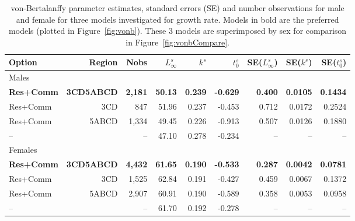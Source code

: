\begin{table}[b]
\centering
\caption{\label{tab:vonbEst} von-Bertalanffy parameter estimates, standard errors (SE) and number observations for male and female \fishname for three models investigated for growth rate. Models in bold are the preferred models (plotted in Figure~\ref{fig:vonb}). These 3 models are superimposed by sex for comparison in Figure~\ref{fig:vonbCompare}.}
\begin{tabular}{lrrrrrrrr}
\hline
Option & Region & Nobs & $L_{\infty}^s$ & $k^s$ & $t_0^s$ & SE($L_{\infty}^s$) & SE($k^s$) & SE($t_0^s$) \\
\hline
Males \\
\textbf{Res+Comm} & \textbf{3CD5ABCD} & \textbf{2,181} & \textbf{50.13} & \textbf{0.239} & \textbf{-0.629} & \textbf{0.400} & \textbf{0.0105} & \textbf{0.1434} \\
Res+Comm & 3CD              & 847   & 51.96 & 0.237 & -0.453 & 0.712 & 0.0172 & 0.2524 \\
Res+Comm & 5ABCD            & 1,334 & 49.45 & 0.226 & -0.913 & 0.507 & 0.0126 & 0.1880 \\
 --      & \citet{arf2001}  & --    & 47.10 & 0.278 & -0.234 &    -- & --     & -- \\
Females \\
\textbf{Res+Comm} & \textbf{3CD5ABCD} & \textbf{4,432} & \textbf{61.65} & \textbf{0.190} & \textbf{-0.533} & \textbf{0.287} & \textbf{0.0042} & \textbf{0.0781} \\
Res+Comm & 3CD              & 1,525 & 62.84 & 0.191 & -0.427 & 0.459 & 0.0067 & 0.1372 \\
Res+Comm & 5ABCD            & 2,907 & 60.91 & 0.190 & -0.589 & 0.358 & 0.0053 & 0.0958 \\
 --      & \citet{arf2001}  & --    & 61.70 & 0.192 & -0.278 & --    & --     & -- \\
\hline
\end{tabular}
\end{table}

